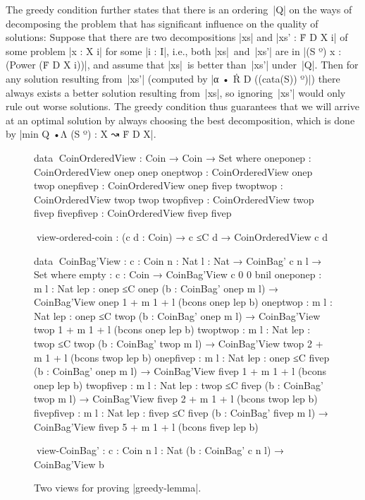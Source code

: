 The greedy condition further states that there is an ordering~|Q| on the ways of decomposing the problem that has significant influence on the quality of solutions:
Suppose that there are two decompositions |xs| and |xs' : Ḟ D X i| of some problem |x : X i| for some |i : I|, i.e., both |xs|~and~|xs'| are in |(S º) x : (Power (Ḟ D X i))|, and assume that |xs|~is better than~|xs'| under~|Q|.
Then for any solution resulting from~|xs'| (computed by |α • Ṙ D ((cata(S)) º)|) there always exists a better solution resulting from~|xs|, so ignoring~|xs'| would only rule out worse solutions.
The greedy condition thus guarantees that we will arrive at an optimal solution by always choosing the best decomposition, which is done by |min Q •Λ (S º) : X ↝ Ḟ D X|.

\begin{figure}
\codefigure\fontsize{10.6pt}{0pt}
\begin{code}
data ^^^CoinOrderedView : Coin → Coin → Set where
  oneponep    : CoinOrderedView  onep   onep
  oneptwop    : CoinOrderedView  onep   twop
  onepfivep   : CoinOrderedView  onep   fivep
  twoptwop    : CoinOrderedView  twop   twop
  twopfivep   : CoinOrderedView  twop   fivep
  fivepfivep  : CoinOrderedView  fivep  fivep

^^^view-ordered-coin : (c d : Coin) → c ≤C d → CoinOrderedView c d

data ^^^CoinBag'View : {c : Coin} {n : Nat} {l : Nat} → CoinBag' c n l → Set where
  empty       :  {c : Coin} → CoinBag'View {c} {0} {0} bnil
  oneponep    :  {m l : Nat} {lep : onep ≤C onep}
                 (b : CoinBag' onep m l) → CoinBag'View {onep} {1 + m} {1 + l} (bcons onep lep b)
  oneptwop    :  {m l : Nat} {lep : onep ≤C twop}
                 (b : CoinBag' onep m l) → CoinBag'View {twop} {1 + m} {1 + l} (bcons onep lep b)
  twoptwop    :  {m l : Nat} {lep : twop ≤C twop}
                 (b : CoinBag' twop m l) → CoinBag'View {twop} {2 + m} {1 + l} (bcons twop lep b)
  onepfivep   :  {m l : Nat} {lep : onep ≤C fivep}
                 (b : CoinBag' onep m l) → CoinBag'View {fivep} {1 + m} {1 + l} (bcons onep lep b)
  twopfivep   :  {m l : Nat} {lep : twop ≤C fivep}
                 (b : CoinBag' twop m l) → CoinBag'View {fivep} {2 + m} {1 + l} (bcons twop lep b)
  fivepfivep  :  {m l : Nat} {lep : fivep ≤C fivep}
                 (b : CoinBag' fivep m l) → CoinBag'View {fivep} {5 + m} {1 + l} (bcons fivep lep b)

^^^view-CoinBag' : {c : Coin} {n l : Nat} (b : CoinBag' c n l) → CoinBag'View b
\end{code}
\caption{Two views for proving |greedy-lemma|.}
\label{fig:greedy-lemma-views}
\end{figure}

